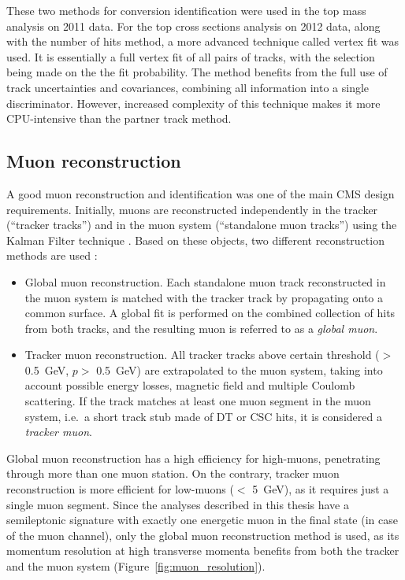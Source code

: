 These two methods for conversion identification were used in the top mass analysis on 2011 data. For the top cross
sections analysis on 2012 data, along with the number of hits method, a more advanced technique called vertex fit was
used. It is essentially a full vertex fit of all pairs of tracks, with the selection being made on the the fit
probability. The method benefits from the full use of track uncertainties and covariances, combining all information
into a single discriminator. However, increased complexity of this technique makes it more CPU-intensive than the
partner track method.


\subsection{Muon reconstruction}
\label{ss:muon_reconstruction}
A good muon reconstruction and identification was one of the main CMS design requirements. Initially, muons are
reconstructed independently in the tracker (``tracker tracks'') and in the muon system (``standalone muon tracks'')
using the Kalman Filter technique \autocite{KF}. Based on these objects, two different reconstruction methods are used
\autocite{muon_reconstruction}:

\begin{itemize}
  \item Global muon reconstruction. Each standalone muon track reconstructed in the muon system is matched with the
  tracker track by propagating onto a common surface. A global fit is performed on the combined collection of hits from
  both tracks, and the resulting muon is referred to as a \textit{global muon}.
  \item Tracker muon reconstruction. All tracker tracks above certain threshold (\pt $>$ \SI{0.5}{\GeV}, $p >$
  \SI{0.5}{\GeV}) are extrapolated to the muon system, taking into account possible energy losses, magnetic field and
  multiple Coulomb scattering. If the track matches at least one muon segment in the muon system, i.e.\ a short track
  stub made of DT or CSC hits, it is considered a \textit{tracker muon}.
\end{itemize}

Global muon reconstruction has a high efficiency for high-\pt muons, penetrating through more than one muon station. On
the contrary, tracker muon reconstruction is more efficient for low-\pt muons (\pt $<$ \SI{5}{\GeV}), as it requires
just a single muon segment. Since the \ttbar analyses described in this thesis have a semileptonic signature with
exactly one energetic muon in the final state (in case of the muon channel), only the global muon reconstruction method
is used, as its momentum resolution at high transverse momenta benefits from both the tracker and the muon system
(Figure~\ref{fig:muon_resolution}).

